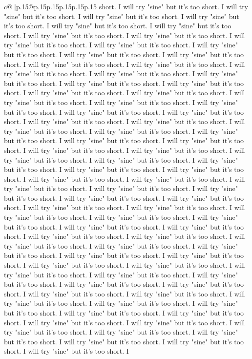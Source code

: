 \documentclass{article}
\begin{document}
{\begin{supertabular}{c@{$\;$}|p{.15\linewidth}@{}p{.15\linewidth}p{.15\linewidth}p{.15\linewidth}p{.15\linewidth}p{.15\linewidth}}
{{{short. I will try "sine" but it's too short. I will try "sine" but it's too short. I will try "sine" but it's too short. I will try "sine" but it's too short. I will try "sine" but it's too short. I will try "sine" but it's too short. I will try "sine" but it's too short. I will try "sine" but it's too short. I will try "sine" but it's too short. I will try "sine" but it's too short. I will try "sine" but it's too short. I will try "sine" but it's too short. I will try "sine" but it's too short. I will try "sine" but it's too short. I will try "sine" but it's too short. I will try "sine" but it's too short. I will try "sine" but it's too short. I will try "sine" but it's too short. I will try "sine" but it's too short. I will try "sine" but it's too short. I will try "sine" but it's too short. I will try "sine" but it's too short. I will try "sine" but it's too short. I will try "sine" but it's too short. I will try "sine" but it's too short. I will try "sine" but it's too short. I will try "sine" but it's too short. I will try "sine" but it's too short. I will try "sine" but it's too short. I will try "sine" but it's too short. I will try "sine" but it's too short. I will try "sine" but it's too short. I will try "sine" but it's too short. I will try "sine" but it's too short. I will try "sine" but it's too short. I will try "sine" but it's too short. I will try "sine" but it's too short. I will try "sine" but it's too short. I will try "sine" but it's too short. I will try "sine" but it's too short. I will try "sine" but it's too short. I will try "sine" but it's too short. I will try "sine" but it's too short. I will try "sine" but it's too short. I will try "sine" but it's too short. I will try "sine" but it's too short. I will try "sine" but it's too short. I will try "sine" but it's too short. I will try "sine" but it's too short. I will try "sine" but it's too short. I will try "sine" but it's too short. I will try "sine" but it's too short. I will try "sine" but it's too short. I will try "sine" but it's too short. I will try "sine" but it's too short. I will try "sine" but it's too short. I will try "sine" but it's too short. I will try "sine" but it's too short. I will try "sine" but it's too short. I will try "sine" but it's too short. I will try "sine" but it's too short. I will try "sine" but it's too short. I will try "sine" but it's too short. I will try "sine" but it's too short. I will try "sine" but it's too short. I will try "sine" but it's too short. I will try "sine" but it's too short. I will try "sine" but it's too short. I will try "sine" but it's too short. I will try "sine" but it's too short. I will try "sine" but it's too short. I will try "sine" but it's too short. I will try "sine" but it's too short. I will try "sine" but it's too short. I will try "sine" but it's too short. I will try "sine" but it's too short. I will try "sine" but it's too short. I will try "sine" but it's too short. I will try "sine" but it's too short. I will try "sine" but it's too short. I will try "sine" but it's too short. I will try "sine" but it's too short. I will try "sine" but it's too short. I will try "sine" but it's too short. I }}}
\end{supertabular}}
\end{document}
